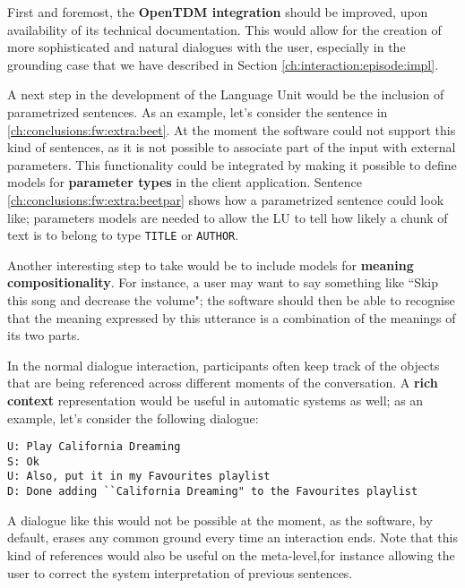 First and foremost, the \textbf{OpenTDM integration} should be improved, upon availability of its technical documentation. This would allow for the creation of more sophisticated and natural dialogues with the user, especially in the grounding case that we have described in Section \ref{ch:interaction:episode:impl}.

A next step in the development of the Language Unit would be the inclusion of parametrized sentences. As an example, let's consider the sentence in \ref{ch:conclusions:fw:extra:beet}. At the moment the software could not support this kind of sentences, as it is not possible to associate part of the input with external parameters. This functionality could be integrated by making it possible to define models for \textbf{parameter types} in the client application. Sentence \ref{ch:conclusions:fw:extra:beetpar} shows how a parametrized sentence could look like; parameters models are needed to allow the LU to tell how likely a chunk of text is to belong to type \texttt{TITLE} or \texttt{AUTHOR}.

\label{ch:conclusions:fw:extra:beet}
\vspace{-0.7cm}
\label{ch:conclusions:fw:extra:beetpar}

Another interesting step to take would be to include models for \textbf{meaning compositionality}. For instance, a user may want to say something like ``Skip this song and decrease the volume"; the software should then be able to recognise that the meaning expressed by this utterance is a combination of the meanings of its two parts.

In the normal dialogue interaction, participants often keep track of the objects that are being referenced across different moments of the conversation. A \textbf{rich context} representation would be useful in automatic systems as well; as an example, let's consider the following dialogue:
\begin{verbatim}
U: Play California Dreaming
S: Ok
U: Also, put it in my Favourites playlist
D: Done adding ``California Dreaming" to the Favourites playlist
\end{verbatim}
A dialogue like this would not be possible at the moment, as the software, by default, erases any common ground every time an interaction ends. Note that this kind of references would also be useful on the meta-level,for instance allowing the user to correct the system interpretation of previous sentences.

